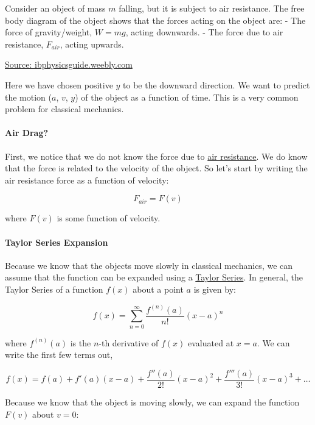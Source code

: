 Consider an object of mass \(m\) falling, but it is subject to air
resistance. The free body diagram of the object shows that the forces
acting on the object are: - The force of gravity/weight, \(W=mg\),
acting downwards. - The force due to air resistance, \(F_{air}\), acting
upwards.

\href{images/notes/week1/570899611.gif}{Source:
ibphysicsguide.weebly.com}

Here we have chosen positive \(y\) to be the downward direction. We want
to predict the motion (\(a\), \(v\), \(y\)) of the object as a function
of time. This is a very common problem for classical mechanics.

\paragraph{Air Drag?}\label{air-drag}

First, we notice that we do not know the force due to
\href{https://en.wikipedia.org/wiki/Drag_(physics)}{air resistance}. We
do know that the force is related to the velocity of the object. So
let's start by writing the air resistance force as a function of
velocity:

\[F_{air} = F(v)\]

where \(F(v)\) is some function of velocity.

\paragraph{Taylor Series Expansion}\label{taylor-series-expansion}

Because we know that the objects move slowly in classical mechanics, we
can assume that the function can be expanded using a
\href{https://en.wikipedia.org/wiki/Taylor_series}{Taylor Series}. In
general, the Taylor Series of a function \(f(x)\) about a point \(a\) is
given by:

\[f(x) = \sum_{n=0}^{\infty} \frac{f^{(n)}(a)}{n!}(x-a)^n\]

where \(f^{(n)}(a)\) is the \(n\)-th derivative of \(f(x)\) evaluated at
\(x=a\). We can write the first few terms out,

\[f(x) = f(a) + f'(a)(x-a) + \frac{f''(a)}{2!}(x-a)^2 + \frac{f'''(a)}{3!}(x-a)^3 + \ldots\]

Because we know that the object is moving slowly, we can expand the
function \(F(v)\) about \(v=0\):

